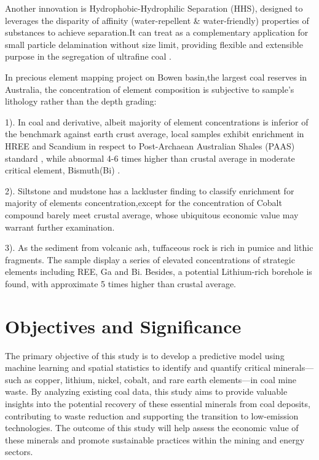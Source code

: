 \documentclass[11pt,a4paper,]{article}
\begin{document}
Another innovation is Hydrophobic-Hydrophilic Separation (HHS), designed to leverages the disparity of affinity (water-repellent \& water-friendly) properties of substances to achieve separation.It can treat as a complementary application for small particle delamination without size limit, providing flexible and extensible purpose in the segregation of ultrafine coal \textcite{Hodgkinson2021}.

In precious \textcite{Hodgkinson2020} element mapping project on Bowen basin,the largest coal reserves in Australia, the concentration of element composition is subjective to sample's lithology rather than the depth grading:

1). In coal and derivative, albeit majority of element concentrations is inferior of the benchmark against earth crust average, local samples exhibit enrichment in HREE and Scandium in respect to \textcite{McLennan2011} Post-Archaean Australian Shales (PAAS) standard , while abnormal 4-6 times higher than crustal average in moderate critical element, Bismuth(Bi) .

2). Siltstone and mudstone has a lackluster finding to classify enrichment for majority of elements concentration,except for the concentration of Cobalt compound barely meet crustal average, whose ubiquitous economic value may warrant further examination.

3). As the sediment from volcanic ash, tuffaceous rock is rich in pumice and lithic fragments. The sample display a series of elevated concentrations of strategic elements including REE, Ga and Bi. Besides, a potential Lithium-rich borehole is found, with approximate 5 times higher than crustal average.

\section{Objectives and Significance}\label{objectives-and-significance}

The primary objective of this study is to develop a predictive model using machine learning and spatial statistics to identify and quantify critical minerals---such as copper, lithium, nickel, cobalt, and rare earth elements---in coal mine waste. By analyzing existing coal data, this study aims to provide valuable insights into the potential recovery of these essential minerals from coal deposits, contributing to waste reduction and supporting the transition to low-emission technologies. The outcome of this study will help assess the economic value of these minerals and promote sustainable practices within the mining and energy sectors.
\end{document}
